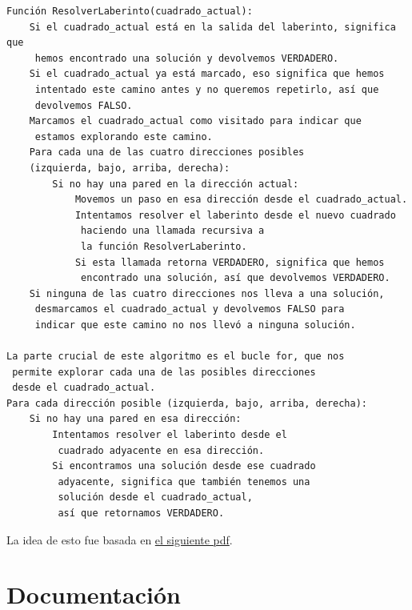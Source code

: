 \documentclass[a4paper,12pt]{article}
\begin{document}
\begin{verbatim}
Función ResolverLaberinto(cuadrado_actual):
    Si el cuadrado_actual está en la salida del laberinto, significa que 
     hemos encontrado una solución y devolvemos VERDADERO.
    Si el cuadrado_actual ya está marcado, eso significa que hemos 
     intentado este camino antes y no queremos repetirlo, así que 
     devolvemos FALSO.
    Marcamos el cuadrado_actual como visitado para indicar que 
     estamos explorando este camino.
    Para cada una de las cuatro direcciones posibles 
    (izquierda, bajo, arriba, derecha):
        Si no hay una pared en la dirección actual:
            Movemos un paso en esa dirección desde el cuadrado_actual.
            Intentamos resolver el laberinto desde el nuevo cuadrado 
             haciendo una llamada recursiva a 
             la función ResolverLaberinto.
            Si esta llamada retorna VERDADERO, significa que hemos 
             encontrado una solución, así que devolvemos VERDADERO.
    Si ninguna de las cuatro direcciones nos lleva a una solución, 
     desmarcamos el cuadrado_actual y devolvemos FALSO para 
     indicar que este camino no nos llevó a ninguna solución.
    
La parte crucial de este algoritmo es el bucle for, que nos 
 permite explorar cada una de las posibles direcciones 
 desde el cuadrado_actual. 
Para cada dirección posible (izquierda, bajo, arriba, derecha):
    Si no hay una pared en esa dirección:
        Intentamos resolver el laberinto desde el 
         cuadrado adyacente en esa dirección.
        Si encontramos una solución desde ese cuadrado 
         adyacente, significa que también tenemos una 
         solución desde el cuadrado_actual, 
         así que retornamos VERDADERO.    
\end{verbatim}

La idea de esto fue basada en \href{https://www.cs.utexas.edu/~scottm/cs314/handouts/slides/Topic13RecursiveBacktracking_4Up.pdf}{el siguiente pdf}.

\section{Documentación}
\end{document}
